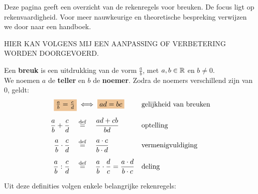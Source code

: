 \documentclass{ximera}
\begin{document}
	\author{Wiskundeplan}
    \label{xim:breuken_theorie}

Deze pagina geeft een overzicht van de rekenregels voor breuken. 
De focus ligt op rekenvaardigheid. Voor meer nauwkeurige en theoretische bespreking verwijzen we door naar een handboek. 

HIER KAN VOLGENS MIJ EEN AANPASSING OF VERBETERING WORDEN DOORGEVOERD. 

\begin{definition}\label{def:breuken}\nl
 
Een \textbf{breuk} is een uitdrukking van de vorm $\frac ab$,  met $a,b\in\mathbb{R}$  en $b\neq0$.
\\[2mm]
We noemen $a$ de \textbf{teller} en $b$ de \textbf{noemer}.
Zodra de noemers verschillend zijn van $0$, geldt:
\begin{align*}
        \important{\frac{a}{b} = \frac{c}{d}}  &\iff \important{ad = bc}
             &&\text{gelijkheid van breuken}
             \\[2mm]
        \frac{a}{b}+\frac{c}{d} \quad&\perdef\quad \frac{ad+cb}{bd}
             &&\text{optelling}
             \\[2mm]
        \frac{a}{b} \cdot \frac{c}{d} \quad&\perdef\quad \frac{a\cdot c}{b\cdot d}
             &&\text{vermenigvuldiging}
             \\[2mm]
        \frac{a}{b} : \frac{c}{d} \quad&\perdef\quad \frac ab \cdot \frac dc = \frac{a\cdot d}{b\cdot c}
             &&\text{deling}
\end{align*}

\end{definition}



Uit deze definities volgen enkele belangrijke rekenregels: 
\end{document}
